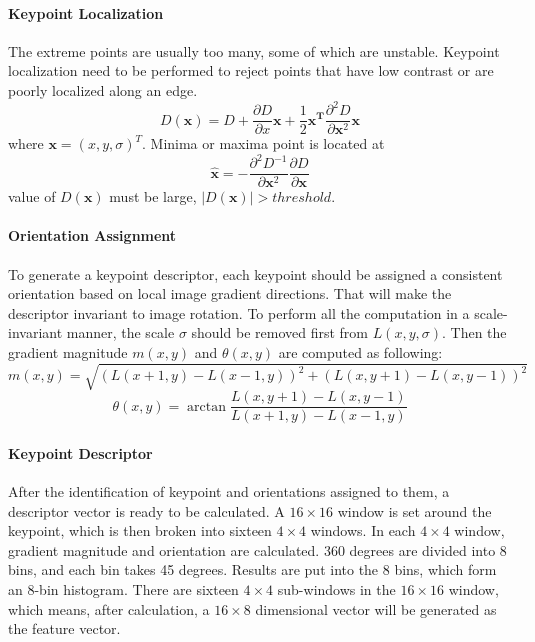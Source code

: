 \documentclass[paper=a4, fontsize=11pt]{scrartcl} %
\numberwithin{equation}{section} %
\numberwithin{figure}{section} %
\numberwithin{table}{section} %
\begin{document}
\paragraph{Keypoint Localization}
The extreme points are usually too many, some of which are unstable.
Keypoint localization need to be performed to reject points that have low contrast or are poorly localized along an edge.
$$
D(\mathbf{x}) = D + \frac{\partial D }{\partial x}\mathbf{x} + \frac{1}{2}\mathbf{x^T}\frac{\partial ^ 2 D}{\partial \mathbf{x}^2}\mathbf{x}
$$
where $\mathbf{x} = (x, y, \sigma)^T$.
Minima or maxima point is located at 
$$
\hat{\mathbf{x}} = -\frac{\partial ^ 2 D^{-1}}{\partial \mathbf{x}^2}\frac{\partial D }{\partial \mathbf{x}}
$$
value of $D(\mathbf{x})$ must be large, $|D(\mathbf{x})| > threshold$.

\paragraph{Orientation Assignment}
To generate a keypoint descriptor, each keypoint should be assigned a consistent orientation based on local image gradient directions. 
That will make the descriptor invariant to image rotation.
To perform all the computation in a scale-invariant manner, the scale $\sigma$ should be removed first from $L(x, y, \sigma)$.
Then the gradient magnitude $m(x, y)$ and $\theta(x, y)$ are computed as following:
$$
m(x, y) = \sqrt{(L(x+1, y) - L(x-1, y))^2 + (L(x, y+1) - L(x, y-1))^2}
$$
$$
\theta(x, y) = \arctan \frac{L(x, y+1) - L(x, y-1)}{L(x+1, y) - L(x- 1,y)}
$$

\paragraph{Keypoint Descriptor}
After the identification of keypoint and orientations assigned to them, a descriptor vector is ready to be calculated. 
A $16 \times 16$ window is set around the keypoint, which is then broken into sixteen $4 \times 4$ windows. 
In each $4 \times 4$ window, gradient magnitude and orientation are calculated. 360 degrees are divided into 8 bins, and each bin takes 45 degrees.
Results are put into the 8 bins, which form an 8-bin histogram.
There are sixteen $ 4 \times 4 $ sub-windows in the $16 \times 16$ window, which means, after calculation, a $16 \times 8$ dimensional vector will be generated as the feature vector.
\end{document}
